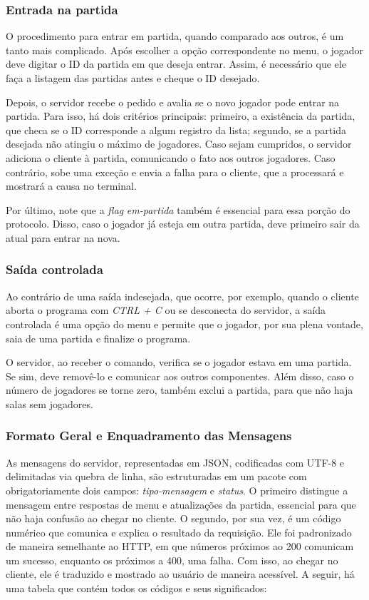 \documentclass[11pt,a4paper]{article}
\begin{document}
\subsubsection{Entrada na partida}

O procedimento para entrar em partida, quando comparado aos outros, é um tanto mais complicado. Após escolher a opção correspondente no menu, o jogador deve digitar o ID da partida em que deseja entrar. Assim, é necessário que ele faça a listagem das partidas antes e cheque o ID desejado.

Depois, o servidor recebe o pedido e avalia se o novo jogador pode entrar na partida. Para isso, há dois critérios principais: primeiro, a existência da partida, que checa se o ID corresponde a algum registro da lista; segundo, se a partida desejada não atingiu o máximo de jogadores. Caso sejam cumpridos, o servidor adiciona o cliente à partida, comunicando o fato aos outros jogadores. Caso contrário, sobe uma exceção e envia a falha para o cliente, que a processará e mostrará a causa no terminal.

Por último, note que a \textit{flag} \textit{em-partida} também é essencial para essa porção do protocolo. Disso, caso o jogador já esteja em outra partida, deve primeiro sair da atual para entrar na nova.

\subsubsection{Saída controlada}

Ao contrário de uma saída indesejada, que ocorre, por exemplo, quando o cliente aborta o programa com \textit{CTRL + C} ou se desconecta do servidor, a saída controlada é uma opção do menu e permite que o jogador, por sua plena vontade, saia de uma partida e finalize o programa. 

O servidor, ao receber o comando, verifica se o jogador estava em uma partida. Se sim, deve removê-lo e comunicar aos outros componentes. Além disso, caso o número de jogadores se torne zero, também exclui a partida, para que não haja salas sem jogadores.


\subsubsection{Formato Geral e Enquadramento das Mensagens}
As mensagens do servidor, representadas em JSON, codificadas com UTF-8 e delimitadas via quebra de linha, são estruturadas em um pacote com obrigatoriamente dois campos: \textit{tipo-mensagem} e \textit{status}. O primeiro distingue a mensagem entre respostas de menu e atualizações da partida, essencial para que não haja confusão ao chegar no cliente. O segundo, por sua vez, é um código numérico que comunica e explica o resultado da requisição. Ele foi padronizado de maneira semelhante ao HTTP, em que números próximos ao 200 comunicam um sucesso, enquanto os próximos a 400, uma falha. Com isso, ao chegar no cliente, ele é traduzido e mostrado ao usuário de maneira acessível. A seguir, há uma tabela que contém todos os códigos e seus significados:
\end{document}
